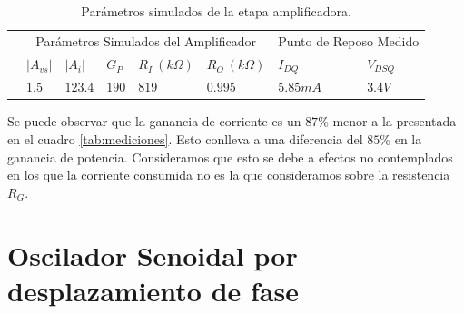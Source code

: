 \documentclass[a4paper, 10pt, spanish]{article}
\begin{document}
\begin{table}[h]
\centering
\begin{tabularx}{0.9\textwidth}{XXXXXXXX}
\hline
\multicolumn{1}{c}{}				& \multicolumn{5}{c}{Parámetros Simulados del Amplificador}						& \multicolumn{2}{c}{Punto de Reposo Medido} \\
									\cmidrule(r){2-6}														\cmidrule(r){7-8}
\multicolumn{1}{c}{}				& $|A_{vs}|$  		& $|A_{i}|$ 		& $G_P$ 			& $R_I\ (k\Omega)$ & $R_O\ (k\Omega)$ 		& $I_{DQ}$ 			& $V_{DSQ}$			\\
									\cmidrule(r){2-2} \cmidrule(r){3-3} \cmidrule(r){4-4} 	\cmidrule(r){5-5} 	\cmidrule(r){6-6} \cmidrule(r){7-7} 	\cmidrule(r){8-8}
\multicolumn{1}{c}{}				& $1.5$	& $123.4$	& $190$ & $819$ & $0.995$ & $5.85mA$& $3.4V$\\
\hline
\end{tabularx}
\caption{Parámetros simulados de la etapa amplificadora.}
\label{tab:simulaciones}
\end{table}

Se puede observar que la ganancia de corriente es un $87\%$ menor a la presentada en el cuadro \ref{tab:mediciones}. Esto conlleva a una diferencia del $85\%$ en la ganancia de potencia. Consideramos que esto se debe a efectos no contemplados en los que la corriente consumida no es la que consideramos sobre la resistencia $R_G$.


\clearpage
        \section{Oscilador Senoidal por desplazamiento de fase}
\end{document}
